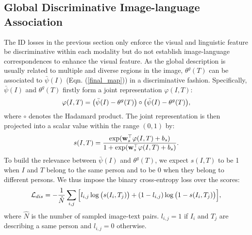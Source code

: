 \documentclass[runningheads]{llncs}
\begin{document}
\subsection{Global Discriminative Image-language Association}

The ID losses in the previous section only enforce the visual and linguistic feature be discriminative within each modality but do not establish image-language correspondences to enhance the visual feature. As the global description is usually related to multiple and diverse regions in the image,  $\theta^{g}(T)$ can be associated to $\bar{\psi}(I)$ (Eqn. (\ref{final_map})) in a discriminative fashion. Specifically, $\bar{\psi}(I)$ and $\theta^{g}(T)$ firstly form a joint representation  $\varphi(I, T)$:
\begin{equation} \small
   \varphi(I, T) = \big(\bar{\psi}(I) - \theta^{g}(T) \big) \circ \big(\bar{\psi}(I) - \theta^{g}(T) \big),  \label{Eqn:r1}
\end{equation}
where $\circ$ denotes the Hadamard product. The joint representation is then projected into a scalar value within the range $(0, 1)$ by:
\begin{equation} \small
    s(I, T) = \frac{ \exp(\bold{w}_{s}^{\top}\varphi(I, T)+ b_{s})}{1+ \exp(\bold{w}_{s}^{\top}\varphi(I, T)+ b_{s})}. \label{Eqn:r2}
\end{equation}
To build the relevance between $\bar{\psi}(I)$ and $\theta^{g}(T)$, we expect $s(I, T)$ to be 1 when $I$ and $T$ belong to the same person and to be $0$ when they belong to different persons. We thus impose the binary cross-entropy loss over the scores:
\begin{equation}\small
 \mathcal{L}_{dis} = - \frac{1}{\hat{N}}\sum_{i,j} \Big[  l_{i,j}\log\big( s(I_{i}, T_{j}) \big) +   (1-l_{i,j})\log\big(1-s(I_{i}, T_{j})\big) \Big],  
 \label{Eq:loss_dis}
\end{equation}
where $\hat{N}$ is the number of sampled image-text pairs. $l_{i,j} =1$  if $I_{i}$ and $T_{j}$ are describing a same person and $l_{i,j}=0$ otherwise.
\end{document}
